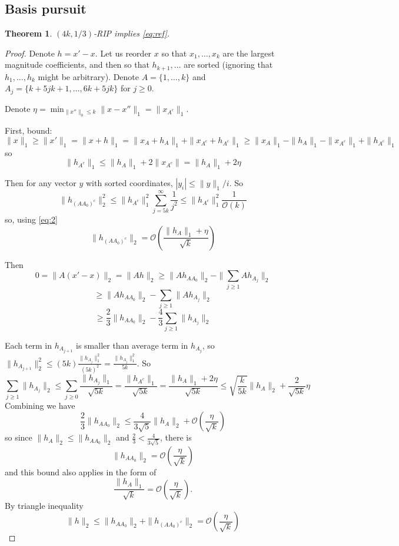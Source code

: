 \documentclass[11pt]{article}
\newtheorem{theorem}{Theorem}
\newcommand{\bigo}{\mathcal{O}}
\begin{document}
\subsection{Basis pursuit}
\begin{theorem}
$(4k,1/3)$-RIP implies \eqref{eq:ref}.
\end{theorem}
\begin{proof}
Denote $h = x'-x$. Let us reorder $x$ so that $x_1,\ldots,x_k$ are the largest magnitude coefficients, and then so that $h_{k+1},\ldots$ are sorted (ignoring that $h_1,\ldots,h_k$ might be arbitrary). Denote $A = \{1,\ldots,k\}$ and $A_j = \{k+5jk+1,\ldots,6k+5jk\}$ for $j \ge 0$.

Denote $\eta = \min_{\|x''\|_0 \le k} \|x - x''\|_1 = \|x_{A^c}\|_1$.

First, bound:
$$\|x\|_1 \ge \|x'\|_1 = \|x + h\|_1 = \|x_A+h_A\|_1 + \|x_{A^c} + h_{A^c}\|_1 \ge \|x_A\|_1 - \|h_A\|_1 - \|x_{A^c}\|_1 + \|h_{A^c}\|_1$$
so
\begin{equation}
\label{eq:2}
\|h_{A^c}\|_1 \le \|h_{A}\|_1 + 2 \|x_{A^c}\| = \|h_{A}\|_1 + 2 \eta
\end{equation}

Then for any vector $y$ with sorted coordinates, $|y_i| \le \|y\|_1/i$. So
$$
\|h_{(AA_0)^c}\|_2^2 \le \|h_{A^c}\|_1^2 \sum_{j=5k}^{\infty} \frac{1}{j^2} \le  \|h_{A^c}\|_1^2 \frac{1}{\bigo(k)}
$$
so, using \eqref{eq:2}
\begin{equation}
\|h_{(AA_0)^c}\|_2 = \bigo(\frac{\|h_{A}\|_1 + \eta}{\sqrt{k}})
\end{equation}

Then
$$0 = \|A(x'-x)\|_2 = \|Ah\|_2 \ge \|A h_{AA_0}\|_2 - \|\sum_{j\ge1} A h_{A_j} \|_2$$
$$ \ge  \|A h_{AA_0}\|_2 - \sum_{j\ge1} \|A h_{A_j} \|_2$$
$$\ge \frac23  \|h_{AA_0}\|_2 - \frac43\sum_{j\ge1} \| h_{A_j} \|_2$$

Each term in $h_{A_{j+1}}$ is smaller than average term in $h_{A_j}$, so $\|h_{A_{j+1}}\|_2^2 \le (5k) \frac{\|h_{A_j}\|_1^2}{(5k)^2} =  \frac{\|h_{A_j}\|_1^2}{5k}$. So
\begin{equation}
\label{eq:4}
\sum_{j\ge1} \| h_{A_j} \|_2 \le \sum_{j \ge 0} \frac{\|h_{A_j}\|_1}{\sqrt{5k}} = \frac{\|h_{A^c}\|_1}{\sqrt{5k}} =  \frac{\|h_{A}\|_1 + 2\eta}{\sqrt{5k}} \le \sqrt{\frac{k}{5k}} \|h_{A}\|_2 + \frac{2}{\sqrt{5k}} \eta
\end{equation}
Combining we have
$$  \frac{2}{3} \|h_{AA_0}\|_2 \le \frac{4}{3 \sqrt{5}} \|h_A\|_2 + \bigo(\frac{\eta}{\sqrt{k}})$$
so since $\|h_A\|_2 \le \|h_{AA_0}\|_2$ and $\frac{2}{3} < \frac{4}{3 \sqrt{5}}$, there is
$$ \|h_{AA_0}\|_2 = \bigo(\frac{\eta}{\sqrt{k}})$$
and this bound also applies in the form of
$$\frac{\|h_{A}\|_1 }{\sqrt{k}} = \bigo(\frac{\eta}{\sqrt{k}}).$$
By triangle inequality
$$\|h\|_2 \le \|h_{AA_0}\|_2 + \|h_{(AA_0)^c}\|_2 =  \bigo(\frac{\eta}{\sqrt{k}})$$
\end{proof}
\end{document}
